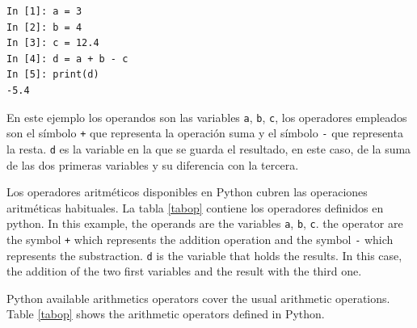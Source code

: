 \begin{center}
    \begin{minipage}{.4\textwidth}
\begin{verbatim}
In [1]: a = 3
In [2]: b = 4
In [3]: c = 12.4
In [4]: d = a + b - c
In [5]: print(d)
-5.4    
\end{verbatim}        
    \end{minipage}
\end{center}

\begin{paracol}{2}
En este ejemplo los operandos son las variables \texttt{a}, \texttt{b}, \texttt{c}, los operadores empleados son el símbolo \texttt{+} que representa la operación suma y el símbolo \texttt{-}  que representa la resta. \texttt{d} es la variable en la que se guarda el resultado, en este caso, de la suma de las dos primeras variables y su diferencia con la tercera.

Los operadores aritméticos disponibles en Python cubren las operaciones aritméticas habituales. La tabla \ref{tabop} contiene los operadores definidos en  python.
\switchcolumn
In this example, the operands are the variables  \texttt{a}, \texttt{b}, \texttt{c}.  the operator are the symbol \texttt{+} which represents the addition operation and the symbol \texttt{-}  which represents the substraction. \texttt{d} is the variable that holds the results. In this case, the addition of the two first variables and the result with the third one.

Python available arithmetics operators cover the usual arithmetic operations. Table \ref{tabop} shows the arithmetic operators defined in Python.
\end{paracol}


